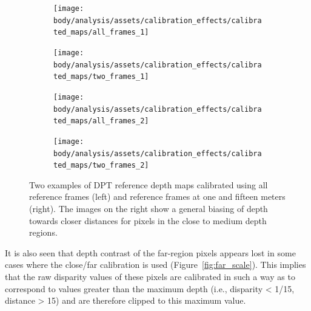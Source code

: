 \begin{figure}[H]
    \centering
    \begin{subfigure}[t]{0.48\textwidth}
        \centering
        \texttt{[image: body/analysis/assets/calibration\_effects/calibrated\_maps/all\_frames\_1]}
    \end{subfigure}
    \begin{subfigure}[t]{0.48\textwidth}
        \centering
        \texttt{[image: body/analysis/assets/calibration\_effects/calibrated\_maps/two\_frames\_1]}
    \end{subfigure}
    
    \vspace{5mm}

    \begin{subfigure}[t]{0.48\textwidth}
        \centering
        \texttt{[image: body/analysis/assets/calibration\_effects/calibrated\_maps/all\_frames\_2]}
    \end{subfigure}
    \begin{subfigure}[t]{0.48\textwidth}
        \centering
        \texttt{[image: body/analysis/assets/calibration\_effects/calibrated\_maps/two\_frames\_2]}
    \end{subfigure}

    \caption{Two examples of DPT reference depth maps calibrated using all reference frames
        (left) and reference frames at one and fifteen meters (right). The images on the right
        show a general biasing of depth towards closer distances for pixels in the close to medium
        depth regions.}
    \label{fig:calibrated_maps}
\end{figure}

It is also seen that depth contrast of the far-region pixels appears lost in some cases where the
close/far calibration is used (Figure~\ref{fig:far_scale}).
This implies that the raw disparity values of these pixels are calibrated in such a way as to correspond
to values greater than the maximum depth (i.e., disparity < 1/15, distance > 15) and are therefore clipped
to this maximum value.

